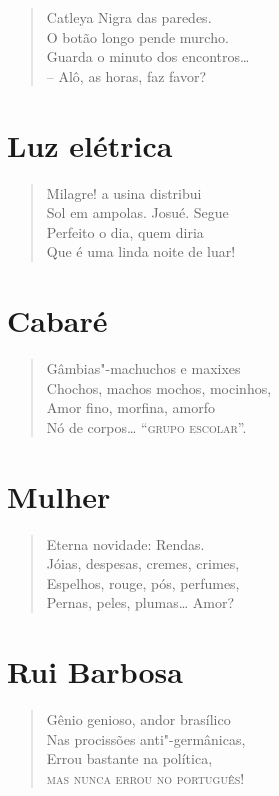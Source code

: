 \begin{verse}
Catleya Nigra das paredes.\\
O botão longo pende murcho.\\
Guarda o minuto dos encontros\ldots{}\\
-- Alô, as horas, faz favor?
\end{verse}


\medskip
\section*{Luz elétrica}

\begin{verse}
Milagre! a usina distribui\\
Sol em ampolas. Josué. Segue\\
Perfeito o dia, quem diria\\
Que é uma linda noite de luar!
\end{verse}


\medskip
\section*{Cabaré}

\begin{verse}
Gâmbias"-machuchos e maxixes\\
Chochos, machos mochos, mocinhos,\\
Amor fino, morfina, amorfo\\
Nó de corpos\ldots{} ``\textsc{grupo escolar}''.
\end{verse}

\medskip
\section*{Mulher}

\begin{verse}
Eterna novidade: Rendas.\\
Jóias, despesas, cremes, crimes,\\
Espelhos, rouge, pós, perfumes,\\
Pernas, peles, plumas\ldots{} Amor?
\end{verse}

\medskip
\section*{Rui Barbosa}

\begin{verse}
Gênio genioso, andor brasílico\\
Nas procissões anti"-germânicas,\\
Errou bastante na política,\\
\textsc{mas nunca errou no português!}
\end{verse}

